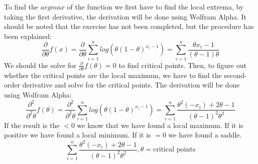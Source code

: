To find the $argmax$ of the function we first have to find the local extrema, by taking the first derivative, the derivation will be done using Wolfram Alpha. It should be noted that the exercise has not been completed, but the procedure has been explained:
$$
\frac{\partial}{\partial\theta}f(x) = \frac{\partial}{\partial\theta} \sum_{i=1}^n log(\theta(1-\theta)^{x_i-1}) =\sum_{i=1}^n  \frac{\theta x_i - 1}{(\theta-1)\theta}
$$
We should the solve for $\frac{\partial}{\partial\theta}f(\theta) = 0$ to find critical points.
Then, to figure out whether the critical points are the local maximum, we have to find the second-order derivative and solve for the critical points. The derivation will be done using Wolfram Alpha:
$$
\frac{\partial^2}{\partial^2\theta}f(\theta) = \frac{\partial^2}{\partial^2\theta} \sum_{i=1}^n log(\theta(1-\theta)^{x_i-1}) = \sum_{i=1}^n \frac{\theta^2(-x_i)+2\theta-1}{(\theta-1)^2\theta^2}
$$
If the result is the $<0$ we know that we have found a local maximum. If it is positive we have found a local minimum. If it is $=0$ we have found a saddle.
$$
\sum_{i=1}^n \frac{\theta^2(-x_i)+2\theta-1}{(\theta-1)^2\theta^2}, \theta = \text{critical points}
$$